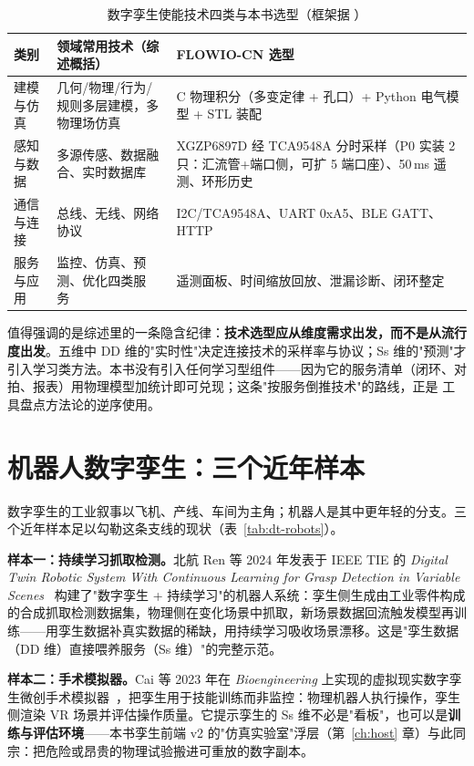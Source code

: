 \begin{table}[htbp]
  \centering
  \caption{数字孪生使能技术四类与本书选型（框架据 \cite{Qi2021}）}
  \label{tab:dt-stack}
  \begin{tabular}{lp{4.4cm}p{4.8cm}}
    \toprule
    类别 & 领域常用技术（综述概括） & FLOWIO-CN 选型 \\
    \midrule
    建模与仿真 & 几何/物理/行为/规则多层建模，多物理场仿真 & C 物理积分（多变定律 + 孔口）+ Python 电气模型 + STL 装配 \\
    感知与数据 & 多源传感、数据融合、实时数据库 & XGZP6897D 经 TCA9548A 分时采样（P0 实装 2 只：汇流管+端口侧，可扩 5 端口座）、50\,ms 遥测、环形历史 \\
    通信与连接 & 总线、无线、网络协议 & I2C/TCA9548A、UART 0xA5、BLE GATT、HTTP \\
    服务与应用 & 监控、仿真、预测、优化四类服务~\cite{Tao2022} & 遥测面板、时间缩放回放、泄漏诊断、闭环整定 \\
    \bottomrule
  \end{tabular}
\end{table}

值得强调的是综述里的一条隐含纪律：\textbf{技术选型应从维度需求出发，而不是从流行度出发}。五维中 DD 维的"实时性"决定连接技术的采样率与协议；Ss 维的"预测"才引入学习类方法。本书没有引入任何学习型组件——因为它的服务清单（闭环、对拍、报表）用物理模型加统计即可兑现；这条"按服务倒推技术"的路线，正是 \cite{Qi2021} 工具盘点方法论的逆序使用。

\section{机器人数字孪生：三个近年样本}
\label{sec:dt-robots}

数字孪生的工业叙事以飞机、产线、车间为主角；机器人是其中更年轻的分支。三个近年样本足以勾勒这条支线的现状（表~\ref{tab:dt-robots}）。

\textbf{样本一：持续学习抓取检测。}北航 Ren 等 2024 年发表于 IEEE TIE 的 \emph{Digital Twin Robotic System With Continuous Learning for Grasp Detection in Variable Scenes}~\cite{Ren2024} 构建了"数字孪生 + 持续学习"的机器人系统：孪生侧生成由工业零件构成的合成抓取检测数据集，物理侧在变化场景中抓取，新场景数据回流触发模型再训练——用孪生数据补真实数据的稀缺，用持续学习吸收场景漂移。这是"孪生数据（DD 维）直接喂养服务（Ss 维）"的完整示范。

\textbf{样本二：手术模拟器。}Cai 等 2023 年在 \emph{Bioengineering} 上实现的虚拟现实数字孪生微创手术模拟器~\cite{Cai2023}，把孪生用于技能训练而非监控：物理机器人执行操作，孪生侧渲染 VR 场景并评估操作质量。它提示孪生的 Ss 维不必是"看板"，也可以是\textbf{训练与评估环境}——本书孪生前端 v2 的"仿真实验室"浮层（第~\ref{ch:host} 章）与此同宗：把危险或昂贵的物理试验搬进可重放的数字副本。

